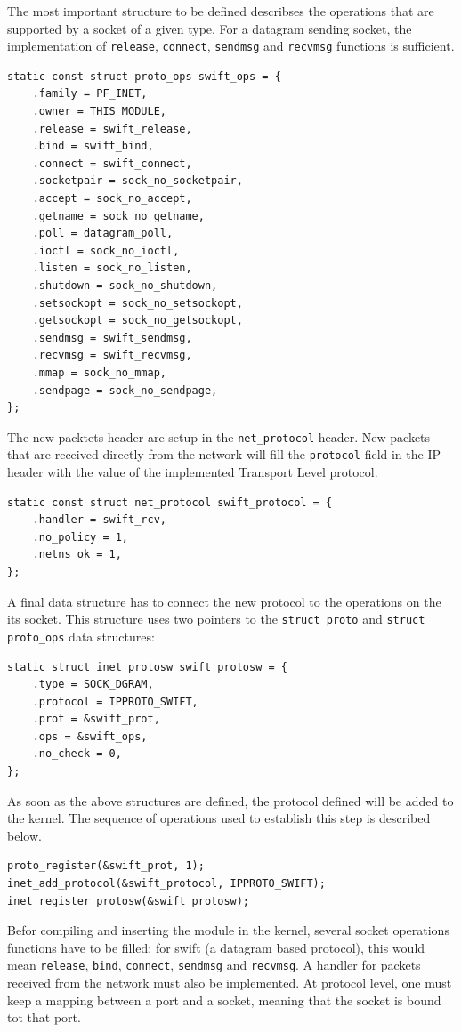 The most important structure to be defined describses the operations that are
supported by a socket of a given type. For a datagram sending socket, the
implementation of \texttt{release}, \texttt{connect}, \texttt{sendmsg} and
\texttt{recvmsg} functions is sufficient.
\begin{verbatim}
static const struct proto_ops swift_ops = {
    .family = PF_INET,
    .owner = THIS_MODULE,
    .release = swift_release,
    .bind = swift_bind,
    .connect = swift_connect,
    .socketpair = sock_no_socketpair,
    .accept = sock_no_accept,
    .getname = sock_no_getname,
    .poll = datagram_poll,
    .ioctl = sock_no_ioctl,
    .listen = sock_no_listen,
    .shutdown = sock_no_shutdown,
    .setsockopt = sock_no_setsockopt,
    .getsockopt = sock_no_getsockopt,
    .sendmsg = swift_sendmsg,
    .recvmsg = swift_recvmsg,
    .mmap = sock_no_mmap,
    .sendpage = sock_no_sendpage,
};
\end{verbatim}

The new packtets header are setup in the \texttt{net\_protocol} header. New
packets that are received directly from the network will fill the
\texttt{protocol} field in the IP header with the value of the implemented
Transport Level protocol.
\begin{verbatim}
static const struct net_protocol swift_protocol = {
    .handler = swift_rcv,
    .no_policy = 1,
    .netns_ok = 1,
};
\end{verbatim}

A final data structure has to connect the new protocol to the operations on
the its socket. This structure uses two pointers to the \texttt{struct proto}
and \texttt{struct proto\_ops} data structures:
\begin{verbatim}
static struct inet_protosw swift_protosw = {
    .type = SOCK_DGRAM,
    .protocol = IPPROTO_SWIFT,
    .prot = &swift_prot,
    .ops = &swift_ops,
    .no_check = 0,
};
\end{verbatim}

As soon as the above structures are defined, the protocol defined will be
added to the kernel. The sequence of operations used to establish this step is
described below.

\begin{verbatim}
proto_register(&swift_prot, 1);
inet_add_protocol(&swift_protocol, IPPROTO_SWIFT);
inet_register_protosw(&swift_protosw);
\end{verbatim}

Befor compiling and inserting the module in the kernel, several socket
operations functions have to be filled; for swift (a datagram based protocol),
this would mean \texttt{release}, \texttt{bind}, \texttt{connect},
\texttt{sendmsg} and \texttt{recvmsg}. A handler for packets received from the
network must also be implemented. At protocol level, one must keep a mapping
between a port and a socket, meaning that the socket is bound tot that port.

